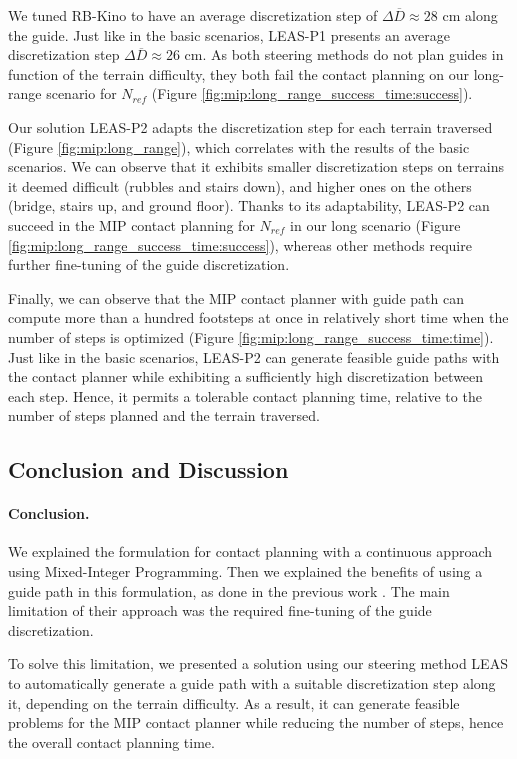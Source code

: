 We tuned RB-Kino to have an average discretization step of $\Delta \overline{D} \approx 28$ cm along the guide.
Just like in the basic scenarios, LEAS-P1 presents an average discretization step $\Delta \overline{D} \approx 26$ cm.
As both steering methods do not plan guides in function of the terrain difficulty, they both fail the contact planning on our long-range scenario for $N_{ref}$ (Figure \ref{fig:mip:long_range_success_time:success}).

Our solution LEAS-P2 adapts the discretization step for each terrain traversed (Figure \ref{fig:mip:long_range}), which correlates with the results of the basic scenarios. 
We can observe that it exhibits smaller discretization steps on terrains it deemed difficult (rubbles and stairs down), and higher ones on the others (bridge, stairs up, and ground floor).
Thanks to its adaptability, LEAS-P2 can succeed in the MIP contact planning for $N_{ref}$ in our long scenario (Figure \ref{fig:mip:long_range_success_time:success}), whereas other methods require further fine-tuning of the guide discretization.

Finally, we can observe that the MIP contact planner with guide path can compute more than a hundred footsteps at once in relatively short time when the number of steps is optimized (Figure \ref{fig:mip:long_range_success_time:time}).
Just like in the basic scenarios, LEAS-P2 can generate feasible guide paths with the contact planner while exhibiting a sufficiently high discretization between each step. Hence, it permits a tolerable contact planning time, relative to the number of steps planned and the terrain traversed.

\subsection{Conclusion and Discussion}
\label{subsub:mip:discussion}
\paragraph{Conclusion.}
We explained the formulation for contact planning with a continuous approach using Mixed-Integer Programming.
Then we explained the benefits of using a guide path in this formulation, as done in the previous work \cite{sl1m_v2}.
The main limitation of their approach was the required fine-tuning of the guide discretization.

To solve this limitation, we presented a solution using our steering method LEAS to automatically generate a guide path with a suitable discretization step along it, depending on the terrain difficulty.
As a result, it can generate feasible problems for the MIP contact planner while reducing the number of steps, hence the overall contact planning time.

